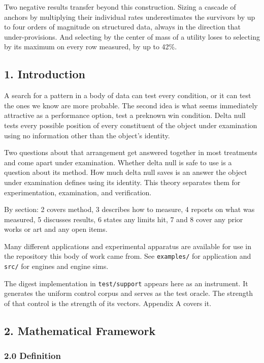 Two negative results transfer beyond this construction. Sizing a cascade of anchors by multiplying their individual rates underestimates the survivors by up to four orders of magnitude on structured data, always in the direction that under-provisions. And selecting by the center of mass of a utility loses to selecting by its maximum on every row measured, by up to 42\%.

\subsection{1. Introduction}

A search for a pattern in a body of data can test every condition, or it can test the ones we know
are more probable. The second idea is what seems immediately attractive as a performance option,
test a preknown win condition. Delta null tests every possible position of every constituent of the
object under examination using no information other than the object's identity.

Two questions about that arrangement get answered together in most treatments and come apart under
examination. Whether delta null is safe to use is a question about its method. How much delta null
saves is an answer the object under examination defines using its identity. This theory separates
them for experimentation, examination, and verification.

By section: 2 covers method, 3 describes how to measure, 4 reports on what was measured, 5
discusses results, 6 states any limits hit, 7 and 8 cover any prior works or art and any open
items.

Many different applications and experimental apparatus are available for use in the repository this
body of work came from. See \texttt{examples/\allowbreak{}} for application and
\texttt{src/\allowbreak{}} for engines and engine sims.

The digest implementation in \texttt{test/\allowbreak{}support} appears here as an instrument. It generates the uniform control corpus and serves as the test oracle. The strength of that control is the strength of its vectors. Appendix A covers it.

\subsection{2. Mathematical Framework}

\subsubsection{2.0 Definition}

